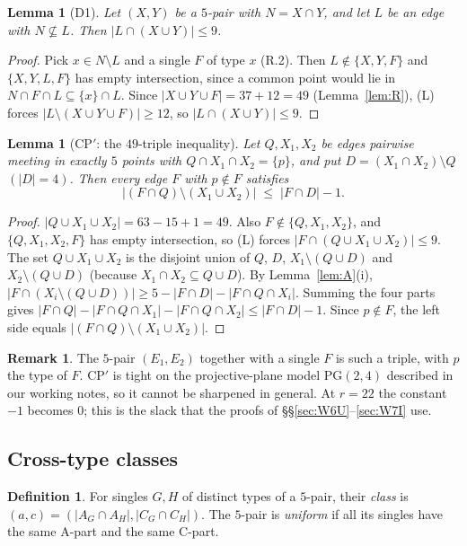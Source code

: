 \documentclass[11pt]{amsart}
\newtheorem{lemma}[theorem]{Lemma}
\theoremstyle{definition}
\newtheorem{definition}[theorem]{Definition}
\newtheorem{remark}[theorem]{Remark}
\begin{document}
\begin{lemma}[D1]\label{lem:D1}
Let $(X,Y)$ be a $5$-pair with $N=X\cap Y$, and let $L$ be an edge with $N\not\subseteq L$. Then $|L\cap(X\cup Y)|\le 9$.
\end{lemma}
\begin{proof}
Pick $x\in N\setminus L$ and a single $F$ of type $x$ (R.2). Then $L\notin\{X,Y,F\}$ and $\{X,Y,L,F\}$ has empty intersection, since a common point would lie in $N\cap F\cap L\subseteq\{x\}\cap L$. Since $|X\cup Y\cup F|=37+12=49$ (Lemma~\ref{lem:R}), (L) forces $|L\setminus(X\cup Y\cup F)|\ge 12$, so $|L\cap(X\cup Y)|\le 9$.
\end{proof}

\begin{lemma}[CP$'$: the $49$-triple inequality]\label{lem:CP}
Let $Q,X_1,X_2$ be edges pairwise meeting in exactly $5$ points with $Q\cap X_1\cap X_2=\{p\}$, and put $D=(X_1\cap X_2)\setminus Q$ $(|D|=4)$. Then every edge $F$ with $p\notin F$ satisfies
\[\bigl|(F\cap Q)\setminus(X_1\cup X_2)\bigr|\;\le\;|F\cap D|-1 .\]
\end{lemma}
\begin{proof}
$|Q\cup X_1\cup X_2|=63-15+1=49$. Also $F\notin\{Q,X_1,X_2\}$, and $\{Q,X_1,X_2,F\}$ has empty intersection, so (L) forces $|F\cap(Q\cup X_1\cup X_2)|\le 9$. The set $Q\cup X_1\cup X_2$ is the disjoint union of $Q$, $D$, $X_1\setminus(Q\cup D)$ and $X_2\setminus(Q\cup D)$ (because $X_1\cap X_2\subseteq Q\cup D$). By Lemma~\ref{lem:A}(i), $|F\cap(X_i\setminus(Q\cup D))|\ge 5-|F\cap D|-|F\cap Q\cap X_i|$. Summing the four parts gives $|F\cap Q|-|F\cap Q\cap X_1|-|F\cap Q\cap X_2|\le |F\cap D|-1$. Since $p\notin F$, the left side equals $|(F\cap Q)\setminus(X_1\cup X_2)|$.
\end{proof}

\begin{remark}
The $5$-pair $(E_1,E_2)$ together with a single $F$ is such a triple, with $p$ the type of $F$. CP$'$ is tight on the projective-plane model $\mathrm{PG}(2,4)$ described in our working notes, so it cannot be sharpened in general. At $r=22$ the constant $-1$ becomes $0$; this is the slack that the proofs of \S\S\ref{sec:W6U}--\ref{sec:W7I} use.
\end{remark}

\subsection{Cross-type classes}
\begin{definition}
For singles $G,H$ of distinct types of a $5$-pair, their \emph{class} is $(a,c)=(|A_G\cap A_H|,|C_G\cap C_H|)$. The $5$-pair is \emph{uniform} if all its singles have the same A-part and the same C-part.
\end{definition}
\end{document}
